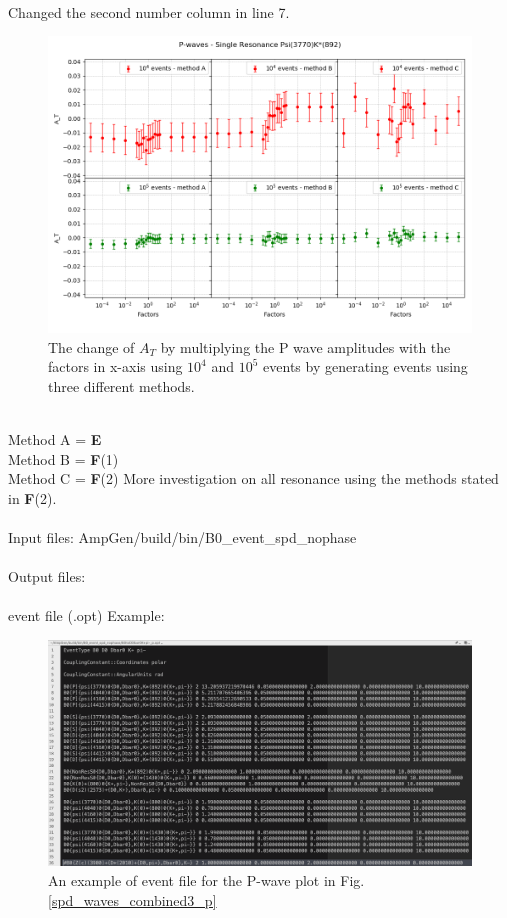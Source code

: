 \\
Changed the second number column in line 7.
\begin{figure}[h]
\center
\includegraphics*[width=0.96\linewidth]{p_wave/spd_waves_sr_3770}
\caption{The change of $A_T$ by multiplying the P wave amplitudes with the factors in x-axis using $10^4$ and $10^5$ events by generating events using three different methods. }
\label{spd_waves_sr_3770}
\end{figure}
\\
Method A = \textbf{E}
\\
Method B = \textbf{F}(1)
\\
Method C = \textbf{F}(2)
\clearpage
\noindent More investigation on all resonance using the methods stated in \textbf{F}(2).
\\
\\
\indent Input files: AmpGen/build/bin/B0\_event\_spd\_nophase 
\\
\\
\indent Output files: 
\\
\\
event file (.opt) Example:
\begin{figure}[h]
\center
\includegraphics*[width=0.86\linewidth]{p_wave/event_info_combine3_spd}
\caption{An example of event file for the P-wave plot in Fig.\ref{spd_waves_combined3_p}}
\label{event_info_combine3_spd}
\end{figure}
